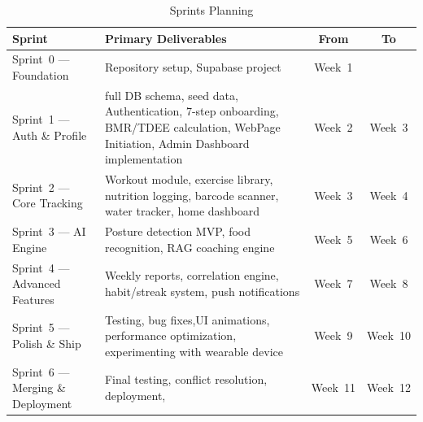 \begin{table}[H]
	\centering
	\caption{Sprints Planning}
	\label{tab:sprints}
	\begin{tabularx}{\textwidth}{lXcc}
		\toprule
		\textbf{Sprint} & \textbf{Primary Deliverables} & \textbf{From} & \textbf{To} \\
		\midrule
		Sprint~0 --- Foundation
		& Repository setup, Supabase project
		& Week~1\\[3pt]
		Sprint~1 --- Auth \& Profile
		& full DB schema, seed data, Authentication, 7-step onboarding, BMR/TDEE calculation, WebPage Initiation, Admin Dashboard implementation
		& Week~2 & Week~3 \\[3pt]
		Sprint~2 --- Core Tracking
		& Workout module, exercise library, nutrition logging, barcode scanner, water tracker, home dashboard
		& Week~3 & Week~4 \\[3pt]
		Sprint~3 --- AI Engine
		& Posture detection MVP, food recognition, RAG coaching engine
		& Week~5 & Week~6 \\[3pt]
		Sprint~4 --- Advanced Features
		& Weekly reports, correlation engine, habit/streak system, push notifications
		& Week~7 & Week~8 \\[3pt]
		Sprint~5 --- Polish \& Ship
		& Testing, bug fixes,UI animations, performance optimization, experimenting with  wearable device
		& Week~9 & Week~10 \\
		Sprint~6 --- Merging \& Deployment
		& Final testing, conflict resolution, deployment,
		& Week~11 & Week~12 \\
		\bottomrule
	\end{tabularx}
\end{table}

\newpage

